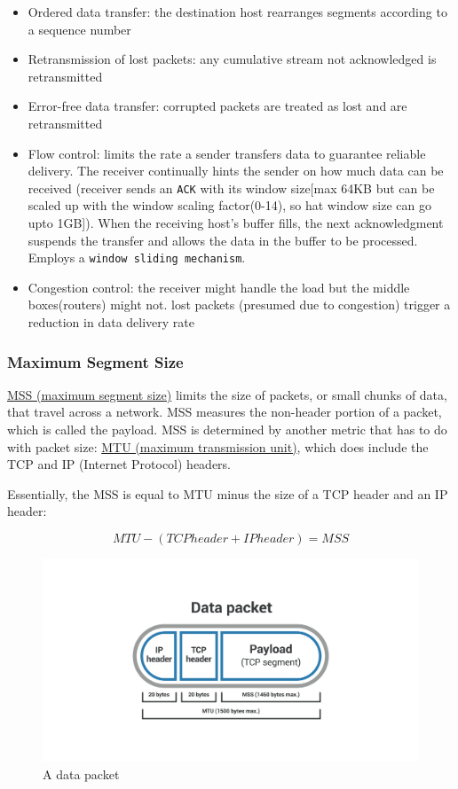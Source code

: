 \documentclass{article}
\begin{document}
\begin{itemize}
    \item Ordered data transfer: the destination host rearranges segments according to a sequence number
    \item Retransmission of lost packets: any cumulative stream not acknowledged is retransmitted
    \item Error-free data transfer: corrupted packets are treated as lost and are retransmitted
    \item Flow control: limits the rate a sender transfers data to guarantee reliable delivery. The receiver continually hints the sender on how much data can be received (receiver sends an \texttt{ACK} with its window size[max 64KB but can be scaled up with the window scaling factor(0-14), so hat window size can go upto 1GB]). When the receiving host's buffer fills, the next acknowledgment suspends the transfer and allows the data in the buffer to be processed. Employs a \texttt{window sliding mechanism}.
    \item Congestion control: the receiver might handle the load but the middle boxes(routers) might not. lost packets (presumed due to congestion) trigger a reduction in data delivery rate
\end{itemize}

\subsubsection*{Maximum Segment Size}

\href{https://www.cloudflare.com/learning/network-layer/what-is-mss/}{MSS (maximum segment size)} limits the size of packets, or small chunks of data, that travel across a network. MSS measures the non-header portion of a packet, which is called the payload. MSS is determined by another metric that has to do with packet size: \href{https://www.cloudflare.com/learning/network-layer/what-is-mtu/}{MTU (maximum transmission unit)}, which does include the TCP and IP (Internet Protocol) headers.

Essentially, the MSS is equal to MTU minus the size of a TCP header and an IP header:

$$ MTU - (TCP header + IP header) = MSS $$

\begin{center}
    \begin{figure}[h]
        \centering
        \includegraphics[width=0.6\linewidth]{files/networking-concepts/data-packet.png}
        \caption{A data packet}
    \end{figure}
\end{center}
\end{document}
